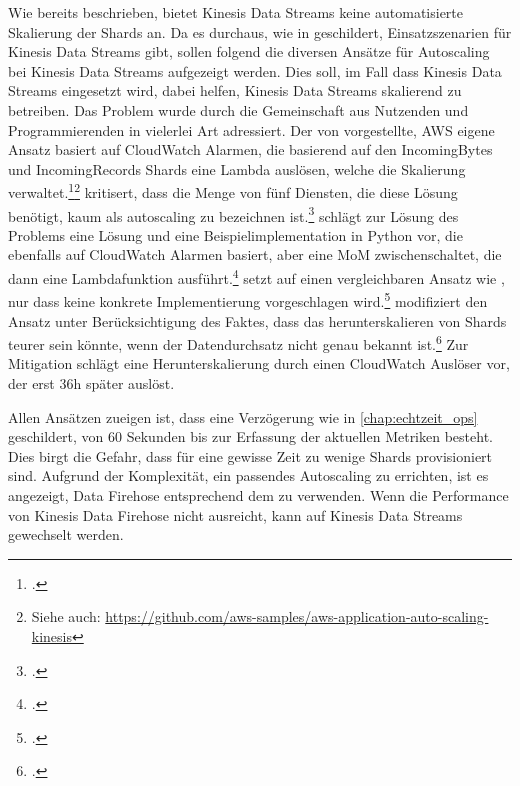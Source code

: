 Wie bereits beschrieben, bietet Kinesis Data Streams keine automatisierte Skalierung der Shards an. Da es durchaus, wie in  geschildert, Einsatzszenarien für Kinesis Data Streams gibt, sollen folgend die diversen Ansätze für Autoscaling bei Kinesis Data Streams aufgezeigt werden. Dies soll, im Fall dass Kinesis Data Streams eingesetzt wird, dabei helfen, Kinesis Data Streams skalierend zu betreiben. Das Problem wurde durch die Gemeinschaft aus Nutzenden und Programmierenden in vielerlei Art adressiert. 
Der von \citeauthor{AmazonWebServices.2018} vorgestellte, \ac{AWS} eigene Ansatz basiert auf CloudWatch Alarmen, die basierend auf den IncomingBytes und IncomingRecords Shards eine Lambda auslösen, welche die Skalierung verwaltet.\footcite[Vgl.][]{AmazonWebServices.2018}\nzitat\footnote{Siehe auch: \url{https://github.com/aws-samples/aws-application-auto-scaling-kinesis}} 
\citeauthor{Pogosova.28.05.2020} kritisert, dass die Menge von fünf Diensten, die diese Lösung benötigt, kaum als autoscaling zu bezeichnen ist.\footcite[Vgl.][]{Pogosova.28.05.2020} 
\citeauthor{Stanley.2019} schlägt zur Lösung des Problems eine Lösung und eine Beispielimplementation in Python vor, die ebenfalls auf CloudWatch Alarmen basiert, aber eine \ac{MoM} zwischenschaltet, die dann eine Lambdafunktion ausführt.\footcite[Vgl.][]{Stanley.2019} 
\citeauthor{Prasath.2019} setzt auf einen vergleichbaren Ansatz wie \citeauthor{Stanley.2019}, nur dass keine konkrete Implementierung vorgeschlagen wird.\footcite[Vgl.][]{Prasath.2019} 
\citeauthor{Cui.2017} modifiziert den Ansatz unter Berücksichtigung des Faktes, dass das herunterskalieren von Shards teurer sein könnte, wenn der Datendurchsatz nicht genau bekannt ist.\footcite[Vgl. auch im Folgendn][]{Cui.2017} Zur Mitigation schlägt \citeauthor{Cui.2017} eine Herunterskalierung durch einen CloudWatch Auslöser vor, der erst 36h später auslöst. 

Allen Ansätzen zueigen ist, dass eine Verzögerung wie in \autoref{chap:echtzeit_ops} geschildert, von 60 Sekunden bis zur Erfassung der aktuellen Metriken besteht. Dies birgt die Gefahr, dass für eine gewisse Zeit zu wenige Shards provisioniert sind. Aufgrund der Komplexität, ein passendes Autoscaling zu errichten, ist es angezeigt, Data Firehose entsprechend dem  zu verwenden. Wenn die Performance von Kinesis Data Firehose nicht ausreicht, kann auf Kinesis Data Streams gewechselt werden.

